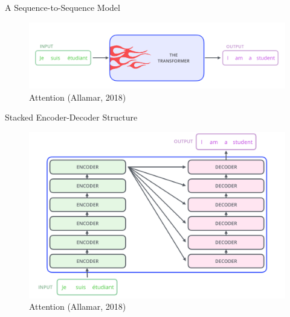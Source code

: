 \documentclass[10pt]{beamer}
\begin{document}
\begin{frame}{A Sequence-to-Sequence Model}

\begin{figure}[h]
\centering
\includegraphics[width=1\textwidth]{fig/alammar_the_transformer_3.png}
\caption{Attention (Allamar, 2018)}
\end{figure}

\end{frame}


\begin{frame}{Stacked Encoder-Decoder Structure}

\begin{figure}[h]
\centering
\includegraphics[width=1\textwidth]{fig/alammar_The_transformer_encoder_decoder_stack}
\caption{Attention (Allamar, 2018)}
\end{figure}

\end{frame}
\end{document}
